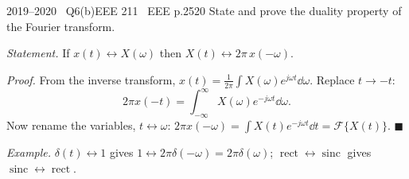 \begin{qcard}{2019--2020 \textbullet\ Q6(b)}{EEE 211 \textbullet\ EEE p.25}{20}
State and prove the duality property of the Fourier transform.
\end{qcard}
\begin{solution}
\emph{Statement.} If $x(t)\leftrightarrow X(\omega)$ then $X(t)\leftrightarrow2\pi\,x(-\omega)$.

\emph{Proof.} From the inverse transform, $x(t)=\frac1{2\pi}\int X(\omega)e^{j\omega t}\dd\omega$. Replace $t\to-t$:
\[2\pi x(-t)=\int_{-\infty}^\infty X(\omega)e^{-j\omega t}\dd\omega .\]
Now rename the variables, $t\leftrightarrow\omega$: $2\pi x(-\omega)=\int X(t)e^{-j\omega t}\dd t=\mathcal F\{X(t)\}$. $\blacksquare$

\emph{Example.} $\delta(t)\leftrightarrow1$ gives $1\leftrightarrow2\pi\delta(-\omega)=2\pi\delta(\omega)$; $\operatorname{rect}\leftrightarrow\operatorname{sinc}$ gives $\operatorname{sinc}\leftrightarrow\operatorname{rect}$.
\end{solution}

